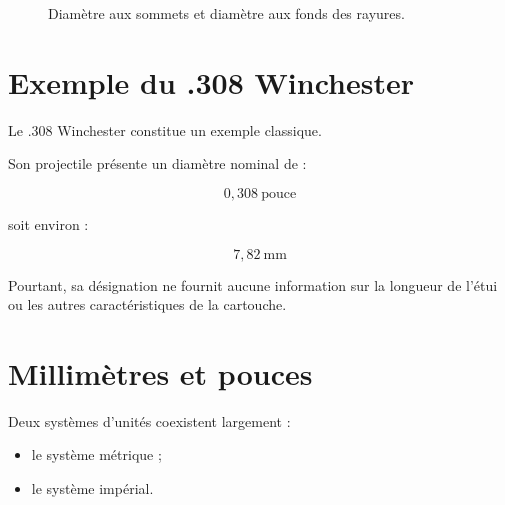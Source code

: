 \begin{figure}[htbp]
\centering


\caption{Diamètre aux sommets et diamètre aux fonds des rayures.}
\label{fig:rayures_coupe}

\end{figure}

\section{Exemple du .308 Winchester}

Le .308 Winchester constitue un exemple classique.

Son projectile présente un diamètre nominal de :

\begin{equation}
0,308~\text{pouce}
\end{equation}

soit environ :

\begin{equation}
7,82~\text{mm}
\end{equation}

Pourtant, sa désignation ne fournit aucune information sur la longueur de
l'étui ou les autres caractéristiques de la cartouche.

\section{Millimètres et pouces}

Deux systèmes d'unités coexistent largement :

\begin{itemize}
    \item le système métrique ;
    \item le système impérial.
\end{itemize}

